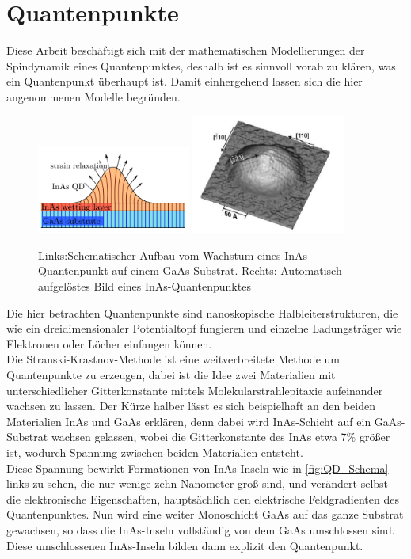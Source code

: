 \chapter{Quantenpunkte}

\noindent Diese Arbeit beschäftigt sich mit der mathematischen Modellierungen der Spindynamik eines Quantenpunktes, deshalb ist es 
sinnvoll vorab zu klären, was ein Quantenpunkt überhaupt ist. Damit einhergehend lassen sich die hier angenommenen Modelle begründen.\\



\begin{figure}[h!]
    \centering
    \includegraphics[width = 0.45\textwidth]{Abbildungen/QD_Schema.png}
    \includegraphics[width = 0.45\textwidth]{Abbildungen/einQD.png}
    \caption{Links:Schematischer Aufbau vom Wachstum eines InAs-Quantenpunkt auf einem GaAs-Substrat. Rechts: Automatisch 
    aufgelöstes Bild eines InAs-Quantenpunktes}
    \label{fig:QD_Schema}
\end{figure}

\noindent Die hier betrachten Quantenpunkte sind nanoskopische Halbleiterstrukturen, die wie ein dreidimensionaler Potentialtopf fungieren
 und einzelne Ladungsträger wie Elektronen oder Löcher einfangen können.\\
Die Stranski-Krastnov-Methode ist eine weitverbreitete Methode um Quantenpunkte zu erzeugen, dabei ist die Idee zwei Materialien mit 
unterschiedlicher Gitterkonstante mittels Molekularstrahlepitaxie aufeinander wachsen zu lassen. Der Kürze halber lässt es sich 
beispielhaft an den beiden Materialien InAs und GaAs erklären, denn dabei wird InAs-Schicht auf ein GaAs-Substrat wachsen gelassen, 
wobei die Gitterkonstante des InAs etwa 7\% größer ist, wodurch Spannung zwischen beiden Materialien entsteht. \\
\noindent Diese Spannung bewirkt Formationen von InAs-Inseln wie in \autoref{fig:QD_Schema} links zu sehen, die nur wenige zehn 
Nanometer groß sind, und verändert selbst die elektronische Eigenschaften, hauptsächlich den elektrische Feldgradienten des 
Quantenpunktes. Nun wird eine weiter Monoschicht GaAs auf das ganze Substrat gewachsen, so dass die InAs-Inseln vollständig von 
dem GaAs umschlossen sind. Diese umschlossenen InAs-Inseln bilden dann explizit den Quantenpunkt.\\


